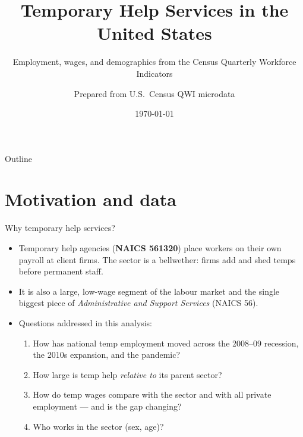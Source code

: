 \documentclass[aspectratio=169,10pt]{beamer}
\title[Temp Help Services (QWI)]{Temporary Help Services in the United States}
\subtitle{Employment, wages, and demographics from the Census Quarterly Workforce Indicators}
\author[QWI analysis]{Prepared from U.S.\ Census QWI microdata}
\date{\today}
\begin{document}
\begin{frame}[plain]
  \titlepage
\end{frame}

\begin{frame}{Outline}
  \tableofcontents
\end{frame}

\section{Motivation and data}
\begin{frame}{Why temporary help services?}
  \begin{itemize}
    \item Temporary help agencies (\textbf{NAICS 561320}) place workers on their own
          payroll at client firms. The sector is a bellwether: firms add and shed
          temps before permanent staff.
    \item It is also a large, low-wage segment of the labour market and the single
          biggest piece of \emph{Administrative and Support Services} (NAICS 56).
    \item Questions addressed in this analysis:
      \begin{enumerate}
        \item How has national temp employment moved across the 2008--09 recession,
              the 2010s expansion, and the pandemic?
        \item How large is temp help \emph{relative to} its parent sector?
        \item How do temp wages compare with the sector and with all private
              employment --- and is the gap changing?
        \item Who works in the sector (sex, age)?
      \end{enumerate}
  \end{itemize}
\end{frame}
\end{document}
